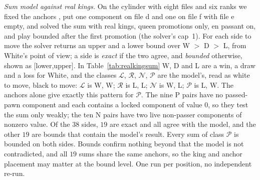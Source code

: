 \emph{Sum model against real kings.} On the cylinder with eight files and six ranks we fixed the anchors
, put one component on file d and one on file f with file e empty, and solved the sum with real
kings, queen promotions only, en passant on, and play bounded after the first promotion (the solver's cap~1).
For each side to move the solver returns an upper and a lower bound over W $>$ D $>$ L, from White's point of view; a side is
\emph{exact} if the two agree, and \emph{bounded} otherwise, shown as $[$lower,upper$]$. In
Table~\ref{tab:realkingsum} W, D and L are a win, a draw and a loss for White, and the classes
$\mathcal L$, $\mathcal R$, $\mathcal N$, $\mathcal P$ are the model's, read as white to move, black to move: $\mathcal L$ is
W, W; $\mathcal R$ is L, L; $\mathcal N$ is W, L; $\mathcal P$ is L, W. The anchors alone give exactly this
pattern for $\mathcal P$. The nine P pairs have no passed-pawn component and each contains a locked component of
value $0$, so they test the sum only weakly; the ten N pairs have two live non-passer components of nonzero value.
Of the $38$ sides, $19$ are exact and all agree with the model, and the other $19$ are bounds that contain the model's
result. Every sum of class $\mathcal P$ is bounded on both sides. Bounds confirm nothing beyond that
the model is not contradicted, and all $19$ sums share the same anchors, so the king and anchor placement may matter
at the bound level. One run per position, no independent re-run.

